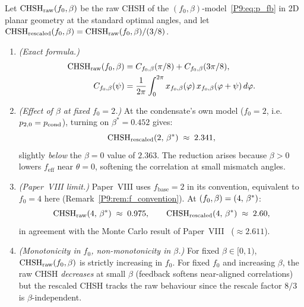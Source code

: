 \begin{theorem}
\label{P9:thm:chsh_fb}
Let $\mathrm{CHSH}_\mathrm{raw}(f_0,\beta)$ be the raw CHSH of the
$(f_0,\beta)$-model~\eqref{P9:eq:p_fb} in 2D planar geometry at the
standard optimal angles, and let
$\mathrm{CHSH}_\mathrm{rescaled}(f_0,\beta) = \mathrm{CHSH}_\mathrm{raw}(f_0,\beta)/(3/8)$.
 
\begin{enumerate}[label=\emph{(\roman*)}]
\item \emph{(Exact formula.)}
  \begin{align}
    \mathrm{CHSH}_\mathrm{raw}(f_0,\beta)
    &= C_{f_0,\beta}(\pi/8) + C_{f_0,\beta}(3\pi/8),
    \label{P9:eq:chsh_fb_formula}\\
    C_{f_0,\beta}(\psi)
    &= \frac{1}{2\pi}\int_0^{2\pi}
       x_{f_0,\beta}(\varphi)\,x_{f_0,\beta}(\varphi+\psi)\,d\varphi.
    \nonumber
  \end{align}
 
\item \emph{(Effect of $\beta$ at fixed $f_0=2$.)}\label{item:beta_effect}
  At the condensate's own model ($f_0=2$, i.e.\ $p_{2,0}=p_{\mathrm{cond}}$),
  turning on $\beta^*=0.452$ gives:
  \begin{equation}
    \mathrm{CHSH}_\mathrm{rescaled}(2,\,\beta^{*})
    \;\approx\; 2.341,
    \label{P9:eq:chsh_beta_pcond}
  \end{equation}
  slightly \emph{below} the $\beta=0$ value of $2.363$.
  The reduction arises because $\beta>0$ lowers $f_\mathrm{eff}$
  near $\theta=0$, softening the correlation at small mismatch angles.
 
\item \emph{(Paper~VIII limit.)}
  Paper~VIII uses $f_\mathrm{base}=2$ in its convention, equivalent to
  $f_0=4$ here (Remark~\ref{P9:rem:f_convention}).
  At $(f_0,\beta) = (4,\,\beta^{*})$:
  \begin{equation}
    \mathrm{CHSH}_\mathrm{raw}(4,\,\beta^{*}) \;\approx\; 0.975,
    \qquad
    \mathrm{CHSH}_\mathrm{rescaled}(4,\,\beta^{*}) \;\approx\; 2.60,
    \label{P9:eq:chsh_paper8}
  \end{equation}
  in agreement with the Monte Carlo result of
  Paper~VIII~\cite{Paper8} ($\approx2.611$).
 
\item \emph{(Monotonicity in $f_0$, non-monotonicity in $\beta$.)}\label{item:monotone_fb}
  For fixed $\beta\in[0,1)$, $\mathrm{CHSH}_\mathrm{raw}(f_0,\beta)$ is
  strictly increasing in $f_0$.
  For fixed $f_0$ and increasing $\beta$, the raw CHSH \emph{decreases}
  at small $\beta$ (feedback softens near-aligned correlations) but the
  rescaled CHSH tracks the raw behaviour since the rescale factor $8/3$
  is $\beta$-independent.
\end{enumerate}
\end{theorem}

